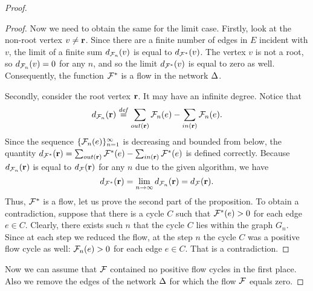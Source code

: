 \documentclass[12pt,oneside,a4paper]{amsart}
\begin{document}
\begin{proof}
\begin{proof}
          Now we need to obtain the same for the limit case.
          Firstly, look at the non-root vertex $v \neq \mathbf{r}$.
          Since there are a finite number of edges in $E$ incident with $v$, the limit of
            a finite sum $d_{\mathcal{F}_{n}}(v)$ is equal to $d_{\mathcal{F^{*}}}(v)$.
          The vertex $v$ is not a root, so $d_{\mathcal{F}_{n}}(v) = 0$ for any $n$, and so the limit $d_{\mathcal{F^{*}}}(v)$ is equal to zero as well.
          Consequently, the function $\mathcal{F^{*}}$ is a flow in the network $\Delta$.

          Secondly, consider the root vertex $\mathbf{r}$.
          It may have an infinite degree.
          Notice that
          \[
            d_{\mathcal{F}_{n}}(\mathbf{r}) \overset{\mathit{def}}{=} \sum_{out(\mathbf{r})} \mathcal{F}_{n}(e) - \sum_{in(\mathbf{r})} \mathcal{F}_{n}(e).
          \]
          Since the sequence $\{\mathcal{F}_{n}(e)\}_{n=1}^\infty$ is decreasing and bounded from below,
            the quantity $d_{\mathcal{F^{*}}}(\mathbf{r})=\sum_{out(\mathbf{r})} \mathcal{F^{*}}(e) - \sum_{in(\mathbf{r})} \mathcal{F^{*}}(e)$ is defined correctly.
          Because $d_{\mathcal{F}_{n}}(\mathbf{r})$ is equal to $d_{\mathcal{F}}(\mathbf{r})$ for any $n$ due to the given algorithm, we have
          \[
            d_{\mathcal{F^{*}}}(\mathbf{r}) = \lim_{n \to \infty} d_{\mathcal{F}_{n}}(\mathbf{r}) = d_{\mathcal{F}}(\mathbf{r}).
          \]
          Thus, $\mathcal{F^{*}}$ is a flow, let us prove the second part of the proposition.
          To obtain a contradiction, suppose that there is a cycle $C$ such that $\mathcal{F^{*}}(e) > 0$ for
            each edge $e \in C$.
          Clearly, there exists such $n$ that the cycle $C$ lies within the graph $G_n$.
          Since at each step we reduced the flow, at the step $n$
            the cycle $C$ was a positive flow cycle as well: $\mathcal{F}_{n}(e) > 0$ for each edge $e \in C$.
          That is a contradiction.
        \end{proof}

        Now we can assume that $\mathcal{F}$ contained no positive flow cycles in the first place.
        Also we remove the edges of the network $\Delta$ for which the flow $\mathcal{F}$ equals zero.

      \medskip

\end{proof}
\end{document}
